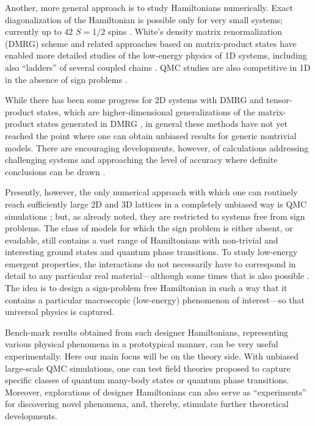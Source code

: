 \documentclass[range]{ar2e}
\begin{document}
Another, more general approach is to study Hamiltonians numerically. Exact diagonalization of the Hamiltonian is possible 
only for very small systems; currently up to $42$ $S=1/2$ spins \cite{Nakano11,Lauchli11}. White's density matrix 
renormalization (DMRG) scheme \cite{White92} and related approaches based on matrix-product states \cite{Schollwock05} 
have enabled more detailed studies of the low-energy physics of 1D systems, including also ``ladders'' of several coupled chains
\cite{Dagotto96}. QMC studies are also competitive in 1D in the absence of sign problems \cite{Sandvik04,Jeckelmann02,Mund09}.

While there has been some progress for 2D systems with DMRG \cite{Stoudenmire12} and tensor-product \cite{Murg09,Gu08,Xie09} states, which are
higher-dimensional generalizations of the  matrix-product states generated in DMRG \cite{Rommer97}, in general these methods have not yet reached the point 
where one  can obtain unbiased results for generic nontrivial models. There are encouraging developments, however, of calculations addressing challenging systems and 
approaching the level of accuracy where definite conclusions can be drawn \cite{Yan11,Bauer12}.

Presently, however, the only numerical approach with which one can routinely reach sufficiently large 2D and 3D lattices in a completely unbiased way 
is QMC simulations \cite{Evertz03,Sandvik10b}; but, as already noted, they are restricted to systems free from sign problems. The class of models 
for which the sign problem is either absent, or evadable,
still contains a vast range of Hamiltonians with non-trivial and interesting 
ground states and quantum phase transitions. To study low-energy emergent properties, the interactions do not necessarily have to correspond in detail to 
any particular real material---although some times that is also possible \cite{Zvyagin07}. The idea is to design a sign-problem free Hamiltonian in such a way that it contains 
a particular macroscopic (low-energy) phenomenon of interest---so that universal physics is captured. 

Bench-mark results obtained from such designer Hamiltonians, representing various physical phenomena in a prototypical manner, can be very useful experimentally. 
Here our main focus will be on the theory side. With unbiased large-scale QMC simulations, one can test field theories proposed to capture specific classes of 
quantum many-body states or quantum phase transitions. Moreover, explorations of designer Hamiltonians can also serve as ``experiments'' for discovering 
novel phenomena, and, thereby, stimulate further theoretical developments.
\end{document}
